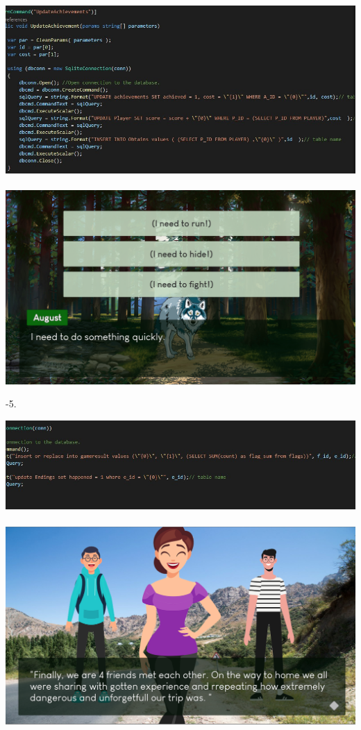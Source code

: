 \documentclass[12pt,a4paper]{article}
\newcommand{\ind}{\indent\indent}
\begin{document}
\begin{center}
\includegraphics[scale=0.7]{images/TESTING/QUERY3.jpg} \\
\ind\\
\includegraphics[scale=0.385]{images/TESTING/2.png} \\
\end{center}
\newpage
\ind{}-5.\\
\begin{center}
\includegraphics[scale=0.7]{images/TESTING/QUERY4.jpg} \\
\ind\\
\includegraphics[scale=0.385]{images/TESTING/6.png} \\
\end{center}
\end{document}
